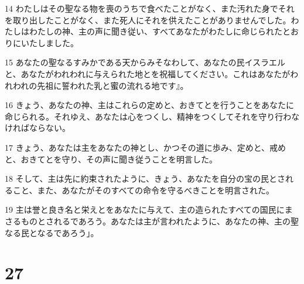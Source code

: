 \par 14 わたしはその聖なる物を喪のうちで食べたことがなく、また汚れた身でそれを取り出したことがなく、また死人にそれを供えたことがありませんでした。わたしはわたしの神、主の声に聞き従い、すべてあなたがわたしに命じられたとおりにいたしました。
\par 15 あなたの聖なるすみかである天からみそなわして、あなたの民イスラエルと、あなたがわれわれに与えられた地とを祝福してください。これはあなたがわれわれの先祖に誓われた乳と蜜の流れる地です』。
\par 16 きょう、あなたの神、主はこれらの定めと、おきてとを行うことをあなたに命じられる。それゆえ、あなたは心をつくし、精神をつくしてそれを守り行わなければならない。
\par 17 きょう、あなたは主をあなたの神とし、かつその道に歩み、定めと、戒めと、おきてとを守り、その声に聞き従うことを明言した。
\par 18 そして、主は先に約束されたように、きょう、あなたを自分の宝の民とされること、また、あなたがそのすべての命令を守るべきことを明言された。
\par 19 主は誉と良き名と栄えとをあなたに与えて、主の造られたすべての国民にまさるものとされるであろう。あなたは主が言われたように、あなたの神、主の聖なる民となるであろう」。

\chapter{27}

